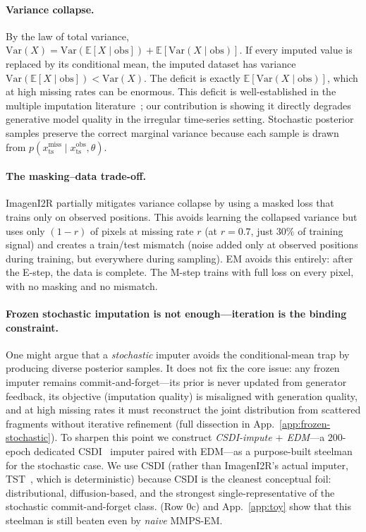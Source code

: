 \documentclass{article}
\theoremstyle{plain}
\theoremstyle{definition}
\theoremstyle{remark}
\newcommand{\xts}{x_{\mathrm{ts}}}
\begin{document}
\paragraph{Variance collapse.}
By the law of total variance, $\mathrm{Var}(X) = \mathrm{Var}(\mathbb{E}[X \mid \mathrm{obs}]) + \mathbb{E}[\mathrm{Var}(X \mid \mathrm{obs})]$. If every imputed value is replaced by its conditional mean, the imputed dataset has variance $\mathrm{Var}(\mathbb{E}[X \mid \mathrm{obs}]) < \mathrm{Var}(X)$. The deficit is exactly $\mathbb{E}[\mathrm{Var}(X \mid \mathrm{obs})]$, which at high missing rates can be enormous. This deficit is well-established in the multiple imputation literature~\citep{rubin1987multiple}; our contribution is showing it directly degrades generative model quality in the irregular time-series setting. Stochastic posterior samples preserve the correct marginal variance because each sample is drawn from $p(\xts^{\mathrm{miss}} \mid \xts^{\mathrm{obs}}, \theta)$.

\paragraph{The masking--data trade-off.}
ImagenI2R partially mitigates variance collapse by using a masked loss that trains only on observed positions. This avoids learning the collapsed variance but uses only $(1-r)$ of pixels at missing rate $r$ (at $r=0.7$, just $30\%$ of training signal) and creates a train/test mismatch (noise added only at observed positions during training, but everywhere during sampling). EM avoids this entirely: after the E-step, the data is complete. The M-step trains with full loss on every pixel, with no masking and no mismatch.

\paragraph{Frozen stochastic imputation is not enough---iteration is the binding constraint.}
One might argue that a \emph{stochastic} imputer avoids the conditional-mean trap by producing diverse posterior samples. It does not fix the core issue: any frozen imputer remains commit-and-forget---its prior is never updated from generator feedback, its objective (imputation quality) is misaligned with generation quality, and at high missing rates it must reconstruct the joint distribution from scattered fragments without iterative refinement (full dissection in App.~\ref{app:frozen-stochastic}). To sharpen this point we construct \emph{CSDI-impute $+$ EDM}---a $200$-epoch dedicated CSDI~\citep{tashiro2021csdi} imputer paired with EDM---as a purpose-built steelman for the stochastic case. We use CSDI (rather than ImagenI2R's actual imputer, TST~\citep{zerveas2021tst}, which is deterministic) because CSDI is the cleanest conceptual foil: distributional, diffusion-based, and the strongest single-representative of the stochastic commit-and-forget class.  (Row 0c) and App.~\ref{app:toy} show that this steelman is still beaten even by \emph{naive} MMPS-EM.
\end{document}
